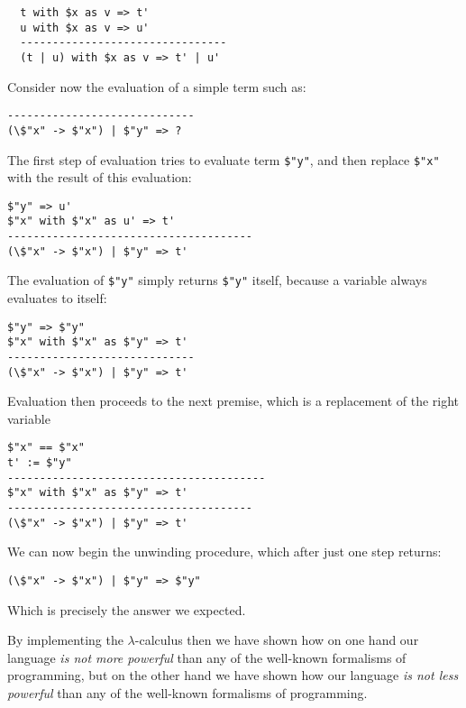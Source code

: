 \begin{lstlisting}
  t with $x as v => t'
  u with $x as v => u'
  --------------------------------
  (t | u) with $x as v => t' | u'
\end{lstlisting}

Consider now the evaluation of a simple term such as:

\begin{lstlisting}
-----------------------------
(\$"x" -> $"x") | $"y" => ?
\end{lstlisting}

The first step of evaluation tries to evaluate term \texttt{\$"y"}, and then replace \texttt{\$"x"} with the result of this evaluation:

\begin{lstlisting}
$"y" => u'
$"x" with $"x" as u' => t'
--------------------------------------
(\$"x" -> $"x") | $"y" => t'
\end{lstlisting}

The evaluation of \texttt{\$"y"} simply returns \texttt{\$"y"} itself, because a variable always evaluates to itself:

\begin{lstlisting}
$"y" => $"y"
$"x" with $"x" as $"y" => t'
-----------------------------
(\$"x" -> $"x") | $"y" => t'
\end{lstlisting}

Evaluation then proceeds to the next premise, which is a replacement of the right variable

\begin{lstlisting}
$"x" == $"x"
t' := $"y"
----------------------------------------
$"x" with $"x" as $"y" => t'
--------------------------------------
(\$"x" -> $"x") | $"y" => t'
\end{lstlisting}

We can now begin the unwinding procedure, which after just one step returns:

\begin{lstlisting}
(\$"x" -> $"x") | $"y" => $"y"
\end{lstlisting}

Which is precisely the answer we expected.


By implementing the $\lambda$-calculus then we have shown how on one hand our language \textit{is not more powerful} than any of the well-known formalisms of programming, but on the other hand we have shown how our language \textit{is not less powerful} than any of the well-known formalisms of programming.

